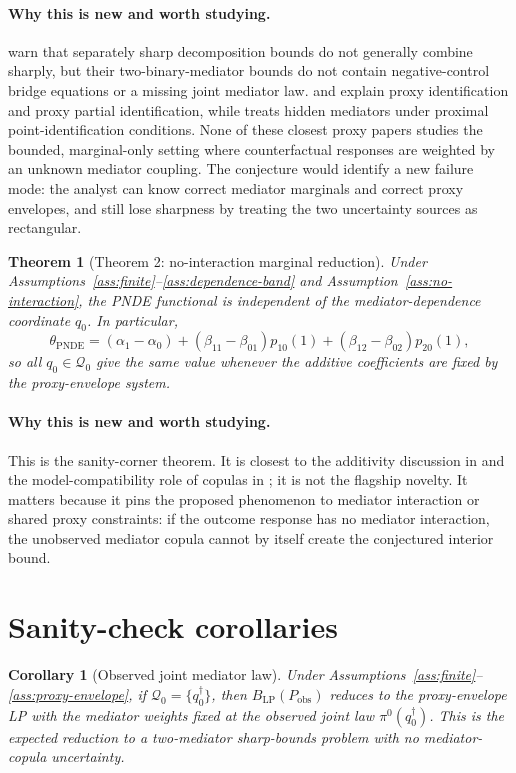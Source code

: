 \documentclass[11pt]{article}
\theoremstyle{definition}
\theoremstyle{plain}
\newtheorem{theorem}{Theorem}
\newtheorem{corollary}{Corollary}
\theoremstyle{remark}
\begin{document}
\paragraph{Why this is new and worth studying.}
\citet{GabrielSachsSjolander2023} warn that separately sharp decomposition
bounds do not generally combine sharply, but their two-binary-mediator bounds
do not contain negative-control bridge equations or a missing joint mediator
law.  \citet{GhassamiShpitserTchetgen2023} and
\citet{DukesShpitserTchetgen2023} explain proxy identification and proxy
partial identification, while \citet{GhassamiYangShpitserTchetgen2025} treats
hidden mediators under proximal point-identification conditions.  None of
these closest proxy papers studies the bounded, marginal-only setting where
counterfactual responses are weighted by an unknown mediator coupling.  The
conjecture would identify a new failure mode: the analyst can know correct
mediator marginals and correct proxy envelopes, and still lose sharpness by
treating the two uncertainty sources as rectangular.

\begin{theorem}[Theorem 2: no-interaction marginal reduction]\label{thm:additive-reduction}
Under Assumptions~\ref{ass:finite}--\ref{ass:dependence-band} and
Assumption~\ref{ass:no-interaction}, the PNDE functional is independent of
the mediator-dependence coordinate \(q_0\).  In particular,
\[
  \theta_{\mathrm{PNDE}}
  =(\alpha_1-\alpha_0)
   +(\beta_{11}-\beta_{01})p_{10}(1)
   +(\beta_{12}-\beta_{02})p_{20}(1),
\]
so all \(q_0\in\mathcal Q_0\) give the same value whenever the additive
coefficients are fixed by the proxy-envelope system.
\end{theorem}

\paragraph{Why this is new and worth studying.}
This is the sanity-corner theorem.  It is closest to the additivity discussion
in \citet{VanderWeeleVansteelandt2014} and the model-compatibility role of
copulas in \citet{XiaChan2022}; it is not the flagship novelty.  It matters
because it pins the proposed phenomenon to mediator interaction or shared
proxy constraints: if the outcome response has no mediator interaction, the
unobserved mediator copula cannot by itself create the conjectured interior
bound.

\section{Sanity-check corollaries}
\begin{corollary}[Observed joint mediator law]\label{cor:joint-observed}
Under Assumptions~\ref{ass:finite}--\ref{ass:proxy-envelope}, if
\(\mathcal Q_0=\{q_0^\dagger\}\), then
\(B_{\mathrm{LP}}(P_{\mathrm{obs}})\) reduces to the proxy-envelope LP with
the mediator weights fixed at the observed joint law \(\pi^0(q_0^\dagger)\).
This is the expected reduction to a two-mediator sharp-bounds problem with no
mediator-copula uncertainty.
\end{corollary}
\end{document}
